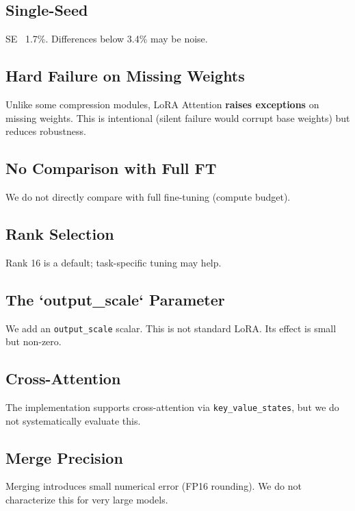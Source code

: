 \subsection{Single-Seed}

SE ~1.7\%. Differences below 3.4\% may be noise.

\subsection{Hard Failure on Missing Weights}

Unlike some compression modules, LoRA Attention \textbf{raises exceptions} on 
missing weights. This is intentional (silent failure would corrupt base 
weights) but reduces robustness.

\subsection{No Comparison with Full FT}

We do not directly compare with full fine-tuning (compute budget). 

\subsection{Rank Selection}

Rank 16 is a default; task-specific tuning may help.

\subsection{The `output\_scale` Parameter}

We add an \texttt{output\_scale} scalar. This is not standard LoRA. Its effect is 
small but non-zero.

\subsection{Cross-Attention}

The implementation supports cross-attention via \texttt{key\_value\_states}, but 
we do not systematically evaluate this.

\subsection{Merge Precision}

Merging introduces small numerical error (FP16 rounding). We do not 
characterize this for very large models.

